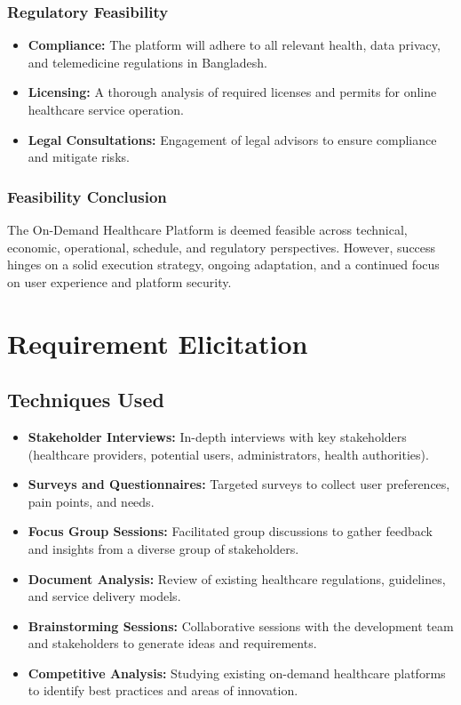 \documentclass[12pt]{article}
\begin{document}
\subsubsection{Regulatory Feasibility}
\begin{itemize}
\item \textbf{Compliance:} The platform will adhere to all relevant health, data privacy, and telemedicine regulations in Bangladesh.
\item  \textbf{Licensing:} A thorough analysis of required licenses and permits for online healthcare service operation.
\item   \textbf{Legal Consultations:} Engagement of legal advisors to ensure compliance and mitigate risks.
\end{itemize}

\subsubsection{Feasibility Conclusion}
The On-Demand Healthcare Platform is deemed feasible across technical, economic, operational, schedule, and regulatory perspectives. However, success hinges on a solid execution strategy, ongoing adaptation, and a continued focus on user experience and platform security.
\section{Requirement Elicitation}
\subsection{Techniques Used}

\begin{itemize}
    \item \textbf{Stakeholder Interviews:} In-depth interviews with key stakeholders (healthcare providers, potential users, administrators, health authorities).
   \item \textbf{Surveys and Questionnaires:} Targeted surveys to collect user preferences, pain points, and needs.
   \item \textbf{Focus Group Sessions:} Facilitated group discussions to gather feedback and insights from a diverse group of stakeholders.
   \item \textbf{Document Analysis:} Review of existing healthcare regulations, guidelines, and service delivery models.
   \item \textbf{Brainstorming Sessions:} Collaborative sessions with the development team and stakeholders to generate ideas and requirements.
   \item \textbf{Competitive Analysis:} Studying existing on-demand healthcare platforms to identify best practices and areas of innovation.
\end{itemize}
\end{document}
